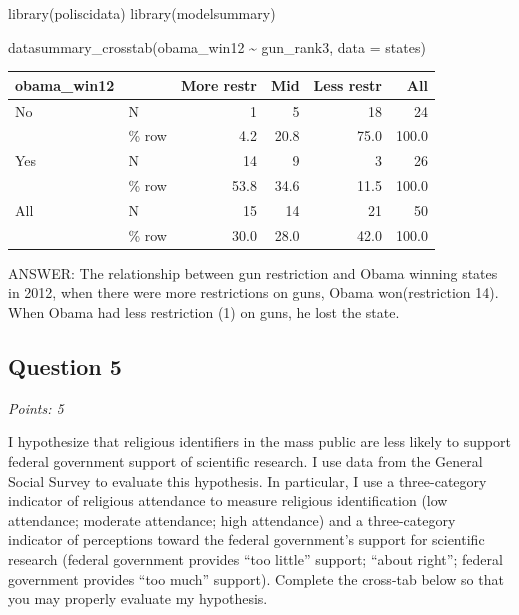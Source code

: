 \documentclass[
  letterpaper,
  DIV=11,
  numbers=noendperiod]{scrartcl}
\newenvironment{Shaded}{\begin{snugshade}}{\end{snugshade}}
\newcommand{\AttributeTok}[1]{\textcolor[rgb]{0.40,0.45,0.13}{#1}}
\newcommand{\FunctionTok}[1]{\textcolor[rgb]{0.28,0.35,0.67}{#1}}
\newcommand{\NormalTok}[1]{\textcolor[rgb]{0.00,0.23,0.31}{#1}}
\newcommand{\SpecialCharTok}[1]{\textcolor[rgb]{0.37,0.37,0.37}{#1}}
\begin{document}
\begin{Shaded}
\begin{Highlighting}[]
\FunctionTok{library}\NormalTok{(poliscidata)}
\FunctionTok{library}\NormalTok{(modelsummary)}

\FunctionTok{datasummary\_crosstab}\NormalTok{(obama\_win12 }\SpecialCharTok{\textasciitilde{}}\NormalTok{ gun\_rank3, }\AttributeTok{data =}\NormalTok{ states)}
\end{Highlighting}
\end{Shaded}

\begin{table}
\centering
\begin{tabular}[t]{llrrrr}
\toprule
obama\_win12 &   & More restr & Mid & Less restr & All\\
\midrule
No & N & 1 & 5 & 18 & 24\\
 & \% row & \num{4.2} & \num{20.8} & \num{75.0} & \num{100.0}\\
Yes & N & 14 & 9 & 3 & 26\\
 & \% row & \num{53.8} & \num{34.6} & \num{11.5} & \num{100.0}\\
All & N & 15 & 14 & 21 & 50\\
 & \% row & \num{30.0} & \num{28.0} & \num{42.0} & \num{100.0}\\
\bottomrule
\end{tabular}
\end{table}

ANSWER: The relationship between gun restriction and Obama winning
states in 2012, when there were more restrictions on guns, Obama
won(restriction 14). When Obama had less restriction (1) on guns, he
lost the state.

\hypertarget{question-5}{%
\subsection{Question 5}\label{question-5}}

\emph{Points: 5}

I hypothesize that religious identifiers in the mass public are less
likely to support federal government support of scientific research. I
use data from the General Social Survey to evaluate this hypothesis. In
particular, I use a three-category indicator of religious attendance to
measure religious identification (low attendance; moderate attendance;
high attendance) and a three-category indicator of perceptions toward
the federal government's support for scientific research (federal
government provides ``too little'' support; ``about right''; federal
government provides ``too much'' support). Complete the cross-tab below
so that you may properly evaluate my hypothesis.
\end{document}
